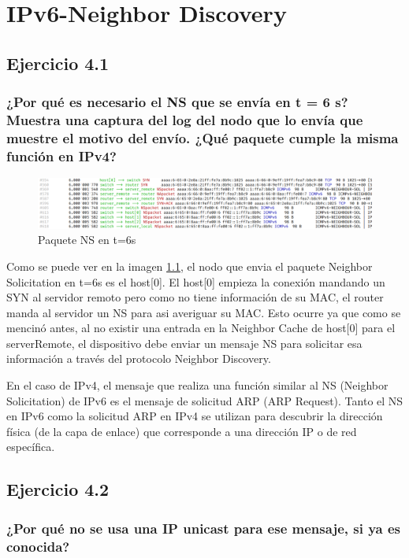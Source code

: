 \chapter{IPv6-Neighbor Discovery}
\label{chap:ipv6_nd}

\section{Ejercicio 4.1}
\subsection{¿Por qué es necesario el NS que se envía en t = 6 s? Muestra una captura del log del nodo que lo envía que muestre el motivo del envío. ¿Qué paquete cumple la misma función en IPv4?}

\begin{figure}[H]
    \centering
    \includegraphics[width=135mm, scale=0.75]{imaxes/captura_ejer4_1.png}
    \caption{Paquete NS en t=6s}
    \label{fig:paquete_ns_t6}
\end{figure}

Como se puede ver en la imagen \ref{fig:paquete_ns_t6}, el nodo que envia el paquete Neighbor Solicitation en t=6s es el host[0]. El host[0] empieza la conexión mandando un SYN al servidor remoto pero como no tiene información de su MAC, el router manda al servidor un NS para asi averiguar su MAC. Esto ocurre ya que como se mencinó antes, al no existir una entrada en la Neighbor Cache de host[0] para el serverRemote, el dispositivo debe enviar un mensaje NS para solicitar esa información a través del protocolo Neighbor Discovery.


En el caso de IPv4, el mensaje que realiza una función similar al NS (Neighbor Solicitation) de IPv6 es el mensaje de solicitud ARP (ARP Request). Tanto el NS en IPv6 como la solicitud ARP en IPv4 se utilizan para descubrir la dirección física (de la capa de enlace) que corresponde a una dirección IP o de red específica.

\section{Ejercicio 4.2}
\subsection{¿Por qué no se usa una IP unicast para ese mensaje, si ya es conocida?}

